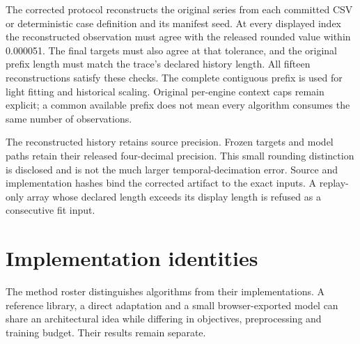 \documentclass[11pt,a4paper]{article}
\begin{document}
The corrected protocol reconstructs the original series from each committed CSV or deterministic case definition and its manifest seed. At every displayed index the reconstructed observation must agree with the released rounded value within 0.000051. The final targets must also agree at that tolerance, and the original prefix length must match the trace's declared history length. All fifteen reconstructions satisfy these checks. The complete contiguous prefix is used for light fitting and historical scaling. Original per-engine context caps remain explicit; a common available prefix does not mean every algorithm consumes the same number of observations.

The reconstructed history retains source precision. Frozen targets and model paths retain their released four-decimal precision. This small rounding distinction is disclosed and is not the much larger temporal-decimation error. Source and implementation hashes bind the corrected artifact to the exact inputs. A replay-only array whose declared length exceeds its display length is refused as a consecutive fit input.





\section{Implementation identities}
The method roster distinguishes algorithms from their implementations. A reference library, a direct adaptation and a small browser-exported model can share an architectural idea while differing in objectives, preprocessing and training budget. Their results remain separate.
\end{document}
